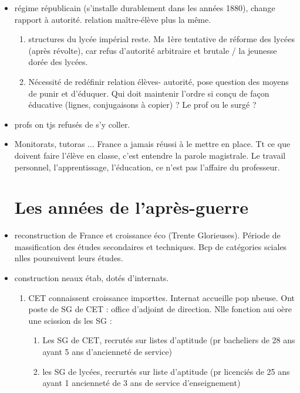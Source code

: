 \documentclass[12pt]{report}
\begin{document}
\begin{itemize}
\item régime républicain (s'installe durablement dans les années 1880), change rapport à autorité. relation maître-élève plus la même. \\
\begin{enumerate}
\item structures du lycée impérial reste. Ms 1ère tentative de réforme des lycées (après révolte), car refus d'autorité arbitraire et brutale / la jeunesse dorée des lycées. \\
\item Nécessité de redéfinir relation élèves- autorité, pose question des moyens de punir et d'éduquer. Qui doit maintenir l'ordre si conçu de façon éducative (lignes, conjugaisons à copier) ? Le prof ou le surgé ?
\end{enumerate}

\item profs on tjs refusés de s'y coller. 
\item Monitorats, tutoras ... France a jamais réussi à le mettre en place. Tt ce que doivent faire l'élève en classe, c'est entendre la parole magistrale. Le travail personnel, l'apprentissage, l'éducation, ce n'est pas l'affaire du professeur.\\

\section{Les années de l'après-guerre}

\item reconstruction de France et croissance éco (Trente Glorieuses). Période de massification des études secondaires et techniques. Bcp de catégories sciales nlles poursuivent leurs études.

\item construction neaux étab, dotés d'internats.
\begin{enumerate}
\item CET connaissent croissance importtes. Internat accueille pop nbeuse. Ont poste de SG de CET : office d'adjoint de direction. Nlle fonction aui oère une scission ds les SG : 
\begin{enumerate}
\item Les SG de CET, recrutés sur listes d'aptitude (pr bacheliers de 28 ans ayant 5 ans d'ancienneté de service) \\
\item les SG de lycées, recrurtés  sur liste d'aptitude (pr licenciés de 25 ans ayant 1 ancienneté de 3 ans de service d'enseignement) \\
\end{enumerate}
\end{enumerate}


\end{itemize}
\end{document}

